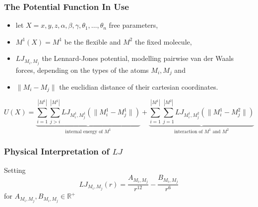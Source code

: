 \documentclass{beamer}
\begin{document}
\begin{frame}
\frametitle{The Potential Function In Use}
\begin{itemize}
	\item let $X = x,y,z,\alpha,\beta,\gamma,\theta_1,\dots,\theta_n$ free parameters,
	\item $M^1(X)=M^1$ be the flexible and $M^2$ the fixed molecule,
	\item $LJ_{M_i,M_j}$ the Lennard-Jones potential, modelling pairwise van der Waals forces, depending on the types of the atoms $M_i,M_j$ and
	\item $\|M_i-M_j\|$ the euclidian distance of their cartesian coordinates.
\end{itemize}

$$U(X) =
\underbrace{\sum_{i=1}^{|M^1|}\sum_{j>i}^{|M^1|}LJ_{M^1_i,M^1_j}(\|M^1_i-M^1_j\|)}_{\text{internal energy of }M^1} + \underbrace{\sum_{i=1}^{|M^1|}\sum_{j=1}^{|M^2|}LJ_{M^1_i,M^2_j}(\|M^1_i-M^2_j\|)}_{\text{interaction of }M^1\text{ and }M^2}$$

\end{frame}


\begin{frame}
\frametitle{Physical Interpretation of $LJ$}
Setting $$LJ_{M_i,M_j}(r) = \frac{A_{M_i,M_j}}{r^{12}}-\frac{B_{M_i,M_j}}{r^6}$$ for $A_{M_i,M_j},B_{M_i,M_j}\in\mathbb R^+$ 

\end{frame}
\end{document}
